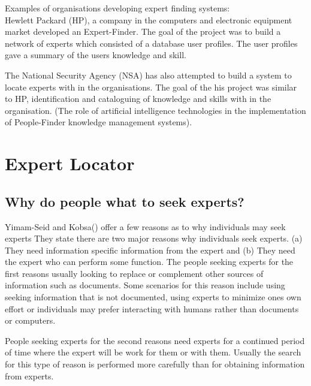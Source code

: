 \documentclass[a4paper,oneside,11pt]{report}
\begin{document}
Examples of organisations developing expert finding systems: \\
Hewlett Packard (HP), a company in the computers and electronic equipment market developed  an Expert-Finder. The goal of the project was to build a network of experts which consisted of a database user profiles. The user profiles gave a summary of the users knowledge and skill. 

The National Security Agency (NSA) has also attempted to build a system to locate experts with in the organisations. The goal of the his project was similar to HP, identification and cataloguing of knowledge and skills with in the organisation. 
(The role of artificial intelligence technologies in the implementation of People-Finder knowledge management systems).

\section{Expert Locator}
\subsection{Why do people what to seek experts?}
Yimam-Seid and Kobsa(\citeyear{kobsaseid2003}) offer a few reasons as to why individuals may seek experts They state there are two major reasons why individuals seek experts. (a) They need information specific information from the expert and (b) They need the expert who can perform some function. The people seeking experts for the first reasons usually looking to replace or complement other sources of information such as documents. Some scenarios for this reason include using seeking information that is not documented, using experts to minimize ones own effort or individuals may prefer interacting with humans rather than documents or computers. 

People seeking experts for the second reasons need experts for a continued period of time where the expert will be work for them or with them. Usually the search for this type of reason is performed more carefully than for obtaining information from experts.
\end{document}
